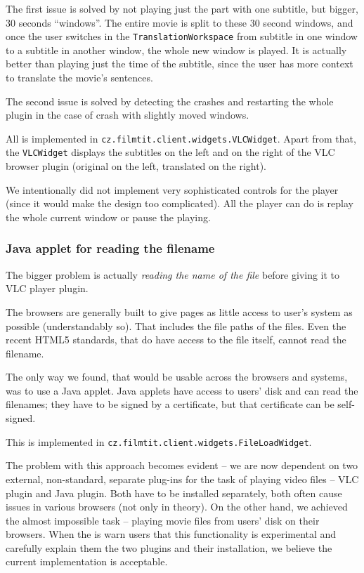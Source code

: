The first issue is solved by not playing just the part with one subtitle, but bigger, 30 seconds ``windows''. The entire movie is split to these 30 second windows, and once the user switches in the {\tt TranslationWorkspace} from subtitle in one window to a subtitle in another window, the whole new window is played. It is actually better than playing just the time of the subtitle, since the user has more context to translate the movie's sentences.

The second issue is solved by detecting the crashes and restarting the whole plugin in the case of crash with slightly moved windows.

All is implemented in \texttt{cz.filmtit.client.widgets.VLCWidget}. Apart from that, the \texttt{VLCWidget} displays the subtitles on the left and on the right of the VLC browser plugin (original on the left, translated on the right).

We intentionally did not implement very sophisticated controls for the player (since it would make the design too complicated). All the player can do is replay the whole current window or pause the playing.

\subsubsection*{Java applet for reading the filename}
The bigger problem is actually \emph{reading the name of the file} before giving it to VLC player plugin.

The browsers are generally built to give pages as little access to user's system as possible (understandably so). That includes the file paths of the files. Even the recent HTML5 standards, that do have access to the file itself, cannot read the filename.

The only way we found, that would be usable across the browsers and systems, was to use a Java applet. Java applets have access to users' disk and can read the filenames; they have to be signed by a certificate, but that certificate can be self-signed.

This is implemented in \texttt{cz.filmtit.client.widgets.FileLoadWidget}.

The problem with this approach becomes evident -- we are now dependent on two external, non-standard, separate plug-ins for the task of playing video files -- VLC plugin and Java plugin. Both have to be installed separately, both often cause issues in various browsers (not only in theory). On the other hand, we achieved the almost impossible task -- playing movie files from users' disk on their browsers. When the is warn users that this functionality is experimental and carefully explain them the two plugins and their installation, we believe the current implementation is acceptable.


